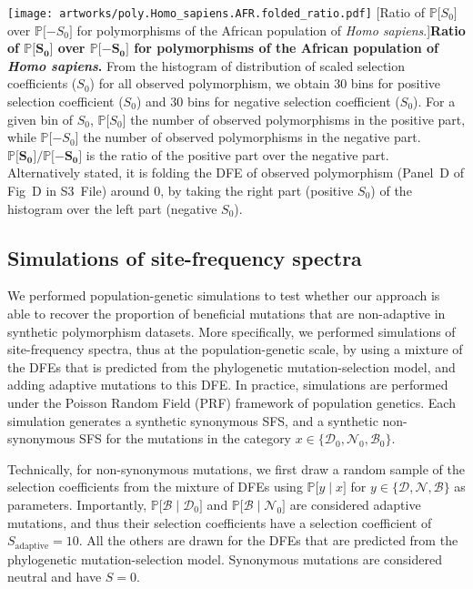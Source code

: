 \documentclass{article}
\newcommand{\proba}{\mathbb{P}}
\newcommand{\Sphy}{S_{0}}
\newcommand{\SphyDel}{\mathcal{D}_0}
\newcommand{\SphyNeu}{\mathcal{N}_0}
\newcommand{\SphyBen}{\mathcal{B}_0}
\newcommand{\given}{\mid}
\newcommand{\SpopDel}{\mathcal{D}}
\newcommand{\SpopNeu}{\mathcal{N}}
\newcommand{\SpopBen}{\mathcal{B}}
\begin{document}
    \begin{center}
        \texttt{[image: artworks/poly.Homo\_sapiens.AFR.folded\_ratio.pdf]}
        [Ratio of $\proba{[}\Sphy{]}$ over $\proba{[}-\Sphy{]}$ for polymorphisms of the African population of \textit{Homo sapiens}.]{\textbf{Ratio of $\bm{\proba{[}\Sphy{]}}$ over $\bm{\proba{[}-\Sphy{]}}$ for polymorphisms of the African population of \textit{Homo sapiens}.}
        From the histogram of distribution of scaled selection coefficients ($\Sphy$) for all observed polymorphism, we obtain 30 bins for positive selection coefficient ($\Sphy$) and 30 bins for negative selection coefficient ($\Sphy$). For a given bin of $\Sphy$, $\proba{[}\Sphy{]}$ the number of observed polymorphisms in the positive part, while $\proba{[}-\Sphy{]}$ the number of observed polymorphisms in the negative part. $\bm{\proba{[}\Sphy{]} / \proba{[}-\Sphy{]}}$ is the ratio of the positive part over the negative part. Alternatively stated, it is folding the DFE of observed polymorphism (Panel~D of Fig~D in S3~File) around 0, by taking the right part (positive $\Sphy$) of the histogram over the left part (negative $\Sphy$).
        }
        \label{mispol-expectation}
    \end{center}

    \newpage
    \subsection{Simulations of site-frequency spectra}

    We performed population-genetic simulations to test whether our approach is able to recover the proportion of beneficial mutations that are non-adaptive in synthetic polymorphism datasets.
    More specifically, we performed simulations of site-frequency spectra, thus at the population-genetic scale, by using a mixture of the DFEs that is predicted from the phylogenetic mutation-selection model, and adding adaptive mutations to this DFE.
    In practice, simulations are performed under the Poisson Random Field (PRF) framework of population genetics\cite{sawyer_population_1992}.
    Each simulation generates a synthetic synonymous SFS, and a synthetic non-synonymous SFS for the mutations in the category $x \in \{ \SphyDel, \SphyNeu, \SphyBen \}$.

    Technically, for non-synonymous mutations, we first draw a random sample of the selection coefficients from the mixture of DFEs using $\proba{[}y \given x{]}$ for $y \in \{ \SpopDel, \SpopNeu, \SpopBen \}$ as parameters.
    Importantly, $\proba{[}\SpopBen \given \SphyDel{]}$ and $\proba{[}\SpopBen \given \SphyNeu{]}$ are considered adaptive mutations, and thus their selection coefficients have a selection coefficient of $S_{\text{adaptive}}=10$.
    All the others are drawn for the DFEs that are predicted from the phylogenetic mutation-selection model.
    Synonymous mutations are considered neutral and have $S=0$.
\end{document}
